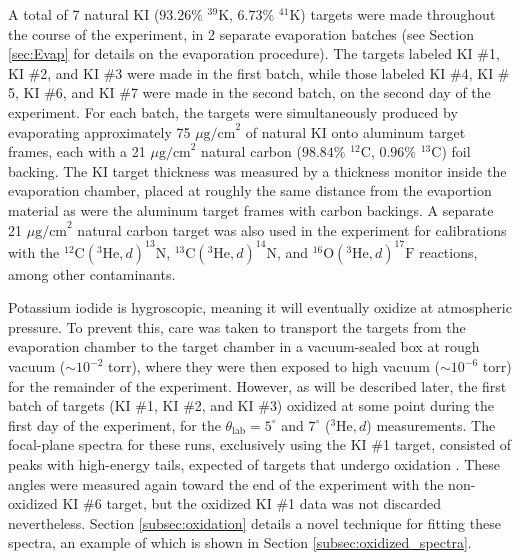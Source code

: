 A total of 7 natural KI ($93.26\%$ $^{39}$K, $6.73\%$ $^{41}$K) targets were made throughout the course of the experiment, in 2 separate evaporation batches (see Section \ref{sec:Evap} for details on the evaporation procedure). The targets labeled KI $\#$1, KI $\#$2, and KI $\#$3 were made in the first batch, while those labeled KI $\#$4, KI $\#$5, KI $\#$6, and KI $\#$7 were made in the second batch, on the second day of the experiment. For each batch, the targets were simultaneously produced by evaporating approximately 75 $\mu\mathrm{g/cm}^{2}$ of natural KI onto aluminum target frames, each with a 21 $\mu\mathrm{g/cm}^{2}$ natural carbon ($98.84\%$ $^{12}$C, $0.96\%$ $^{13}$C) foil backing. The KI target thickness was measured by a thickness monitor inside the evaporation chamber, placed at roughly the same distance from the evaportion material as were the aluminum target frames with carbon backings.
A separate 21 $\mu\mathrm{g/cm}^{2}$ natural carbon target was also used in the experiment for calibrations with the $^{12}\mathrm{C}(^{3}\mathrm{He},d)^{13}\mathrm{N}$, $^{13}\mathrm{C}(^{3}\mathrm{He},d)^{14}\mathrm{N}$, and $^{16}\mathrm{O}(^{3}\mathrm{He},d)^{17}\mathrm{F}$ reactions, among other contaminants.


Potassium iodide is hygroscopic, meaning it will eventually oxidize at atmospheric pressure. To prevent this, care was taken to transport the targets from the evaporation chamber to the target chamber in a vacuum-sealed box at rough vacuum ($\sim 10^{-2}$ torr), where they were then exposed to high vacuum ($\sim 10^{-6}$ torr) for the remainder of the experiment. However, as will be described later, the first batch of targets (KI $\#$1, KI $\#$2, and KI $\#$3) oxidized at some point during the first day of the experiment, for the $\theta_{\mathrm{lab}} = 5^{\circ}$ and $7^{\circ}$ ($^{3}\mathrm{He},d$) measurements. The focal-plane spectra for these runs, exclusively using the KI $\#$1 target, consisted of peaks with high-energy tails, expected of targets that undergo oxidation \cite{Landau1944}. These angles were measured again toward the end of the experiment with the non-oxidized KI $\#$6 target, but the oxidized KI $\#$1 data was not discarded nevertheless. Section \ref{subsec:oxidation} details a novel technique for fitting these spectra, an example of which is shown in Section \ref{subsec:oxidized_spectra}.

